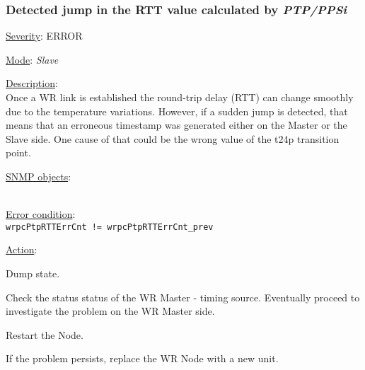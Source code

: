 \subsubsection{\bf Detected jump in the RTT value calculated by \emph{PTP/PPSi}}
		\label{fail:timing:rtt_jump}
		\begin{pck_descr}
			\item [] \underline{Severity}: ERROR
			\item [] \underline{Mode}: \emph{Slave}
			\item [] \underline{Description}:\\
				Once a WR link is established the round-trip delay (RTT) can change
				smoothly due to the temperature variations. However, if a sudden jump is
				detected, that means that an erroneous timestamp was generated either on
				the Master or the Slave side.
				One cause of that could be the wrong value of the t24p transition point.
			\item [] \underline{SNMP objects}:\\
				{\footnotesize
				\\
				 }
			\item [] \underline{Error condition}:\\
				{\footnotesize
				\texttt{wrpcPtpRTTErrCnt != wrpcPtpRTTErrCnt\_prev} }
      \item [] \underline{Action}:
        \begin{pck_proc}
        \item Dump state.
        \item Check the status status of the WR Master - timing source.
          Eventually proceed to investigate the problem on the WR Master side.
        \item Restart the Node.
        \item If the problem persists, replace the WR Node with a new unit.
        \end{pck_proc}
		\end{pck_descr}

